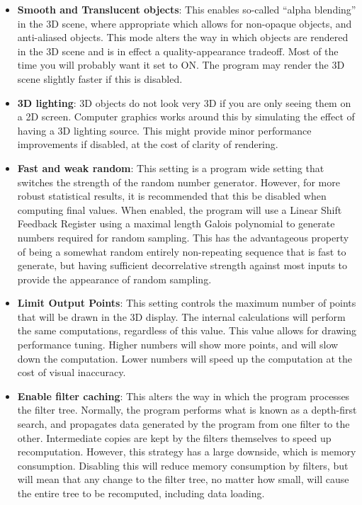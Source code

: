 \documentclass[10pt]{article}
\begin{document}
\begin{itemize}
\item  \textbf{Smooth and Translucent objects}: This enables so-called ``alpha blending'' in the 3D scene, where appropriate which allows for non-opaque objects, and anti-aliased objects. This mode alters the way in which objects are rendered in the 3D scene and is in effect a quality-appearance tradeoff. Most of the time you will probably want it set to ON. The program may render the 3D scene slightly faster if this is disabled.
 
\item  \textbf{3D lighting}: 3D objects do not look very 3D if you are only seeing them on a 2D screen. Computer graphics works around this by simulating the effect of having a 3D lighting source. This might provide minor performance improvements if disabled, at the cost of clarity of rendering.

\item \textbf{Fast and weak random}: This setting is a program wide setting that switches the strength of the random number generator. However, for more robust statistical results, it is recommended that this be disabled when computing final values. When enabled, the program will use a Linear Shift Feedback Register using a maximal length Galois polynomial to generate numbers required for random sampling. This has the advantageous property of being a somewhat random entirely non-repeating sequence that is fast to generate, but having sufficient decorrelative strength against most inputs to provide the appearance of random sampling. 

\item \textbf{Limit Output Points}: This setting controls the maximum number of points that will be drawn in the 3D display. The internal calculations will perform the same computations, regardless of this value. This value allows for drawing performance tuning. Higher numbers will show more points, and will slow down the computation. Lower numbers will speed up the computation at the cost of visual inaccuracy.


 
\item \textbf{Enable filter caching}: This alters the way in which the program processes the filter tree. Normally, the program performs what is known as a depth-first search, and propagates data generated by the program from one filter to the other. Intermediate copies are kept by the filters themselves to speed up recomputation. However, this strategy has a large downside, which is memory consumption. Disabling this will reduce memory consumption by filters, but will mean that any change to the filter tree, no matter how small, will cause the entire tree to be recomputed, including data loading.


\end{itemize}
\end{document}
